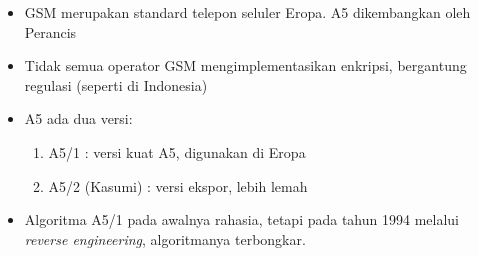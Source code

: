 \documentclass{article}
\begin{document}

\begin{itemize}
    \item GSM merupakan standard telepon seluler Eropa. A5 dikembangkan oleh Perancis
    \item Tidak semua operator GSM mengimplementasikan enkripsi, bergantung regulasi (seperti di Indonesia)
    \item A5 ada dua versi:
    \begin{enumerate}
        \item A5/1 : versi kuat A5, digunakan di Eropa
        \item A5/2 (Kasumi) : versi ekspor, lebih lemah
    \end{enumerate}
    \item Algoritma A5/1 pada awalnya rahasia, tetapi pada tahun 1994 melalui \textit{reverse engineering}, algoritmanya terbongkar.
\end{itemize}
\end{document}
